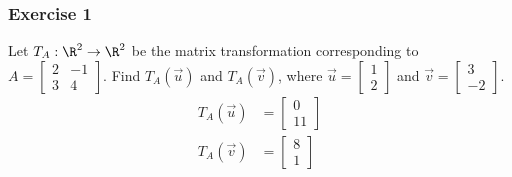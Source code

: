 \documentclass[letterpaper, 12pt]{math}
\begin{document}
\subsubsection*{Exercise 1}
Let \( T_A:\R^2\to\R^2 \) be the matrix transformation corresponding to
\( A = \begin{bmatrix}2 & -1 \\ 3 & 4\end{bmatrix} \). Find \( T_A(\vec{u}) \)
and \( T_A(\vec{v}) \), where \( \vec{u} = \begin{bmatrix}1 \\ 2\end{bmatrix} \)
and \( \vec{v} = \begin{bmatrix}3 \\ -2\end{bmatrix} \).
\begin{align*}
  T_A(\vec{u}) &= \begin{bmatrix}0 \\ 11\end{bmatrix} \\
  T_A(\vec{v}) &= \begin{bmatrix}8 \\ 1\end{bmatrix}
\end{align*}
\end{document}

